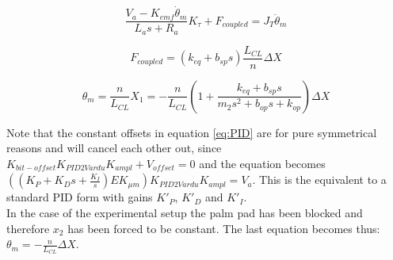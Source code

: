 	\begin{equation}
		\frac{V_a - K_{emf}\dot{\theta}_m}{L_a s + R_a} K_{\tau} + F_{coupled} = J_T \ddot{\theta}_m
		\label{eq:motor_torques}
	\end{equation}
	
	\begin{equation}
		F_{coupled} = (k_{eq} + b_{sp}s) \frac{L_{CL}}{n} \Delta X
		\label{eq:fcoupled}
	\end{equation}
	
	\begin{equation}
		\theta_m = \frac{n}{L_{CL}} X_1 = -\frac{n}{L_{CL}}(1 + \frac{k_{eq} + b_{sp}s}{m_2 s^2 + b_{op}s + k_{op}}) \Delta X
	\label{eq:theta}
	\end{equation}
	
	Note that the constant offsets in equation \ref{eq:PID} are for pure symmetrical reasons and will cancel each other out, since $K_{bit-offset} K_{PID2Vardu} K_{ampl} + V_{offset} = 0$ and the equation becomes $ ((K_P + K_D s + \frac{K_I}{s})E K_{\mu m} ) K_{PID2Vardu} K_{ampl}= V_a$. This is the equivalent to a standard PID form with gains $K'_P$, $K'_D$ and $K'_I$.\\
	In the case of the experimental setup the palm pad has been blocked and therefore $x_2$ has been forced to be constant. The last equation becomes thus: $\theta_m = - \frac{n}{L_{CL}} \Delta X$.
	
